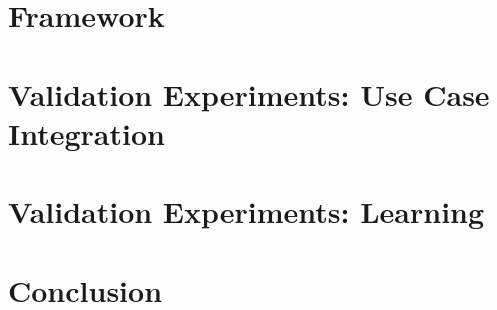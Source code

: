 
\section{\skillmodelabbr{} Framework}\label{ch:architecture:skill}

\section{\softwarecap}\label{ch:architecture:mios}

\section{Validation Experiments: Use Case Integration}\label{ch:architecture:system}

\section{Validation Experiments: Learning}\label{ch:architecture:learning}

\section{Conclusion}\label{ch:architecture:conclusion}
